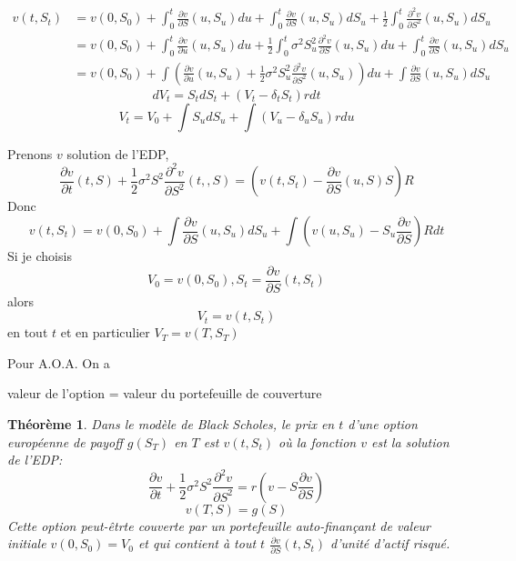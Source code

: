 \documentclass{article}
\theoremstyle{plain}
\newtheorem{thm}{Th\'eor\`eme}[section]
\theoremstyle{definition}
\begin{document}
\begin{equation}
\begin{split}
v(t, S_t)&=v(0,S_0)+\int_0^t\frac{\partial v}{\partial S}(u,S_u)du+\int_0^t\frac{\partial v}{\partial S}(u, S_u)
 dS_u + \frac{1}{2}\int_0^t\frac{\partial^2 v}{\partial S^2}(u,S_u)dS_u\\
 &=v(0,S_0)+\int_0^t\frac{\partial v}{\partial u}(u,S_u)du+\frac{1}{2}\int_0^t\sigma^2S_u^2\frac{\partial^2 v}{\partial S}(u,S_u)du+\int_0^t\frac{\partial v}{\partial S}(u, S_u)dS_u\\
 &=v(0,S_0)+\int (\frac{\partial v}{\partial u}(u,S_u)+\frac{1}{2}\sigma^2S_u^2\frac{\partial^2 v}{\partial S^2}(u,S_u))du+\int \frac{\partial v}{\partial S}(u, S_u)dS_u
\end{split}
\end{equation}
\begin{equation}
dV_t=S_tdS_t+(V_t-\delta_tS_t)r dt
\end{equation}
\begin{equation}
V_t=V_0+\int S_u dS_u+\int (V_u-\delta_uS_u)rdu
\end{equation}

Prenons $v$ solution de l'EDP,
\begin{equation}
\frac{\partial v}{\partial t}(t,S)+\frac{1}{2}\sigma^2S^2\frac{\partial^2 v}{\partial S^2}(t,,S)=(v(t,S_t)-\frac{\partial v}{\partial S}(u,S)S)R
\end{equation}
Donc 
\begin{equation}
v(t,S_t)=v(0,S_0)+\int\frac{\partial v}{\partial S}(u,S_u) dS_u+\int (v(u,S_u)-S_u\frac{\partial v}{\partial S})Rdt
\end{equation}
Si je choisis
\begin{equation}
V_0=v(0,S_0), S_t=\frac{\partial v}{\partial S}(t,S_t)
\end{equation}
alors
\begin{equation}
V_t=v(t,S_t)
\end{equation}
en tout $t$ et en particulier $V_T=v(T,S_T)$

Pour A.O.A. On a

valeur de l'option = valeur du portefeuille de couverture

\begin{thm}
	Dans le mod\`ele de Black Scholes, le prix en $t$ d'une option europ\'eenne de payoff $g(S_T)$ en $T$ est $v(t,S_t)$ o\`u la fonction $v$ est la solution de l'EDP:
	\begin{equation}
\frac{\partial v}{\partial t}+\frac{1}{2} \sigma^2 S^2 \frac{\partial^2 v}{\partial S^2}=r(v-S\frac{\partial v}{\partial S})
\end{equation}
\begin{equation}
v(T,S) = g(S)
\end{equation}
Cette option peut-\^etrte couverte par un portefeuille auto-finan\c{c}ant de valeur initiale $v(0,S_0)=V_0$ et qui contient \`a tout $t$ $\frac{\partial v}{\partial S}(t,S_t)$ d'unit\'e d'actif risqu\'e.
\end{thm}
\end{document}
